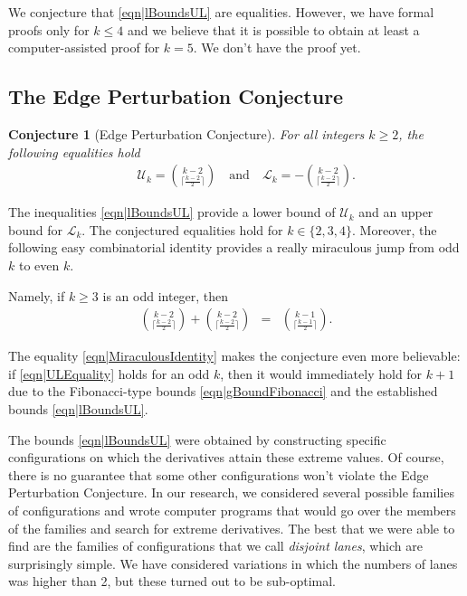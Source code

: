 \documentclass[reqno]{amsart}
\newtheorem{conjecture}[theorem]{Conjecture}
\def\ConjectureName{Edge Perturbation Conjecture}
\begin{document}
 
We conjecture that \eqref{eqn|lBoundsUL} are equalities. However, we have formal proofs only for $k\leq 4$ and we believe 
that it is possible to obtain at least a computer-assisted proof for $k=5$. We don't have the proof yet.
 


\subsection{The {\ConjectureName}}
\begin{conjecture}[\ConjectureName]
For all integers $k\geq2$, the following equalities hold 
\begin{eqnarray}&& \mathcal U_k=\binom{k-2}{\lceil\frac{k-2}2\rceil}\quad\mbox{and}\quad 
\mathcal L_k=-\binom{k-2}{\lceil\frac{k-2}2\rceil}. \label{eqn|ULEquality}
\end{eqnarray}
\end{conjecture}
The inequalities \eqref{eqn|lBoundsUL} provide a lower bound of $\mathcal U_k$ and an upper bound for $\mathcal L_k$. The conjectured equalities hold for $k\in\{2,3,4\}$. Moreover, the following easy combinatorial identity provides a really miraculous jump from odd $k$ to even $k$. 

Namely, if $k\geq 3$ is an odd integer, then 
\begin{eqnarray}
\binom{k-2}{\lceil\frac{k-2}2\rceil}+\binom{k-2}{\lceil\frac{k-2}2\rceil}&=& \binom{k-1}{\lceil\frac{k-1}2\rceil}.\label{eqn|MiraculousIdentity}
\end{eqnarray} 

The equality \eqref{eqn|MiraculousIdentity} makes the conjecture even more believable: if \eqref{eqn|ULEquality} holds for an odd $k$, then it would immediately hold for $k+1$ due to the Fibonacci-type bounds 
\eqref{eqn|gBoundFibonacci} and the established bounds \eqref{eqn|lBoundsUL}.

The bounds \eqref{eqn|lBoundsUL} were obtained by constructing specific configurations on which the derivatives attain these extreme values. Of course, there is no guarantee that some other configurations won't violate the {\ConjectureName}. In our research, we considered several possible families of configurations and wrote computer programs that would go over the members of the families and search for extreme derivatives. The best that we were able to find are the families of configurations that we call {\em disjoint lanes}, which are surprisingly simple. We have considered variations in which the numbers of lanes was higher than 2, but these turned out to be sub-optimal. 
\end{document}
